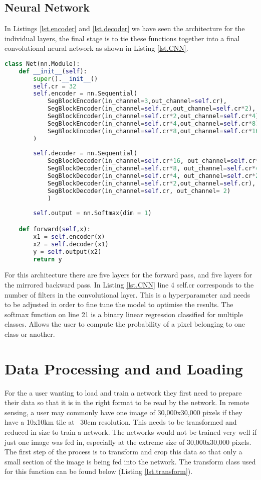 \subsection{Neural Network}
In Listings \ref{lst.encoder} and \ref{lst.decoder} we have seen the architecture for the individual layers, the final stage is to tie these functions together into a final convolutional neural network as shown in Listing \ref{lst.CNN}.
\begin{lstlisting}[language=Python, caption = Fully connected Convolutional Neural Network, label={lst.CNN}]
class Net(nn.Module):
    def __init__(self):
        super().__init__()
        self.cr = 32
        self.encoder = nn.Sequential(
            SegBlockEncoder(in_channel=3,out_channel=self.cr),
            SegBlockEncoder(in_channel=self.cr,out_channel=self.cr*2),
            SegBlockEncoder(in_channel=self.cr*2,out_channel=self.cr*4),
            SegBlockEncoder(in_channel=self.cr*4,out_channel=self.cr*8),
            SegBlockEncoder(in_channel=self.cr*8,out_channel=self.cr*16)
        )
        
        self.decoder = nn.Sequential(
            SegBlockDecoder(in_channel=self.cr*16, out_channel=self.cr*8),
            SegBlockDecoder(in_channel=self.cr*8, out_channel=self.cr*4),
            SegBlockDecoder(in_channel=self.cr*4, out_channel=self.cr*2),
            SegBlockDecoder(in_channel=self.cr*2,out_channel=self.cr),
            SegBlockDecoder(in_channel=self.cr, out_channel= 2)
            )
        
        self.output = nn.Softmax(dim = 1)

    def forward(self,x):
        x1 = self.encoder(x)
        x2 = self.decoder(x1)
        y = self.output(x2)
        return y
\end{lstlisting}
For this architecture there are five layers for the forward pass, and five layers for the mirrored backward pass. In Listing \ref{lst.CNN} line 4 self.cr corresponds to the number of filters in the convolutional layer. This is a hyperparameter and needs to be adjusted in order to fine tune the model to optimise the results. The softmax function on line 21 is a binary linear regression classified for multiple classes. Allows the user to compute the probability of a pixel belonging to one class or another.


\section{Data Processing and and Loading}
For the a user wanting to load and train a network they first need to prepare their data so that it is in the right format to be read by the network. In remote sensing, a user may commonly have one image of 30,000x30,000 pixels if they have a 10x10km tile at ~30cm resolution. This needs to be transformed and reduced in size to train a network. The networks would not be trained very well if just one image was fed in, especially at the extreme size of 30,000x30,000 pixels. The first step of the process is to transform and crop this data so that only a small section of the image is being fed into the network. The transform class used for this function can be found below (Listing \ref{lst.transform}).
